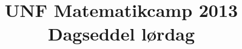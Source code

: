 \documentclass[article,10pt,oneside]{article}
\begin{document}
\title{UNF Matematikcamp 2013 \\ Dagseddel lørdag}

\begin{minipage}[t]{410mm}
\begin{minipage}[t]{200mm}

\end{minipage}%
\hspace{10mm}\begin{minipage}[t]{200mm}

\end{minipage}
\end{minipage}

\newpage

\begin{minipage}[t]{410mm}

\end{minipage}
\end{document}
